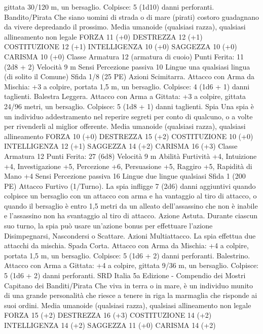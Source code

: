 \begin{multicols}{2}
gittata 30/120 m, un bersaglio.
Colpisce: 5 (1d10) danni perforanti.
Bandito/Pirata
Che siano uomini di strada o di mare (pirati) costoro
guadagnano da vivere depredando il prossimo.
Media umanoide (qualsiasi razza), qualsiasi allineamento non
legale
FORZA 11 (+0)
DESTREZZA 12 (+1)
COSTITUZIONE 12 (+1)
INTELLIGENZA 10 (+0)
SAGGEZZA 10 (+0)
CARISMA 10 (+0)
Classe Armatura 12 (armatura di cuoio)
\hspace*{0pt}\hfill{Punti Ferita}: 11 (2d8 + 2)
Velocità 9 m
Sensi Percezione passiva 10
Lingue una qualsiasi lingua (di solito il Comune)
Sfida 1/8 (25 PE)
Azioni
Scimitarra. Attacco con Arma da Mischia: +3 a colpire, portata
1,5 m, un bersaglio.
Colpisce: 4 (1d6 + 1) danni taglienti.
Balestra Leggera. Attacco con Arma a Gittata: +3 a colpire,
gittata 24/96 metri, un bersaglio.
Colpisce: 5 (1d8 + 1) danni taglienti.
Spia
Una spia è un individuo addestramento nel reperire
segreti per conto di qualcuno, o a volte per rivenderli al
miglior offerente.
Media umanoide (qualsiasi razza), qualsiasi allineamento
FORZA 10 (+0)
DESTREZZA 15 (+2)
COSTITUZIONE 10 (+0)
INTELLIGENZA 12 (+1)
SAGGEZZA 14 (+2)
CARISMA 16 (+3)
Classe Armatura 12
\hspace*{0pt}\hfill{Punti Ferita}: 27 (6d8)
Velocità 9 m
Abilità Furtività +4, Intuizione +4, Investigazione +5,
Percezione +6, Persuasione +5, Raggiro +5, Rapidità di Mano +4
Sensi Percezione passiva 16
Lingue due lingue qualsiasi
Sfida 1 (200 PE)
Attacco Furtivo (1/Turno). La spia infligge 7 (2d6) danni aggiuntivi
quando colpisce un bersaglio con un attacco con arma e ha vantaggio
al tiro di attacco, o quando il bersaglio è entro 1,5 metri da un alleato
dell’assassino che non è inabile e l’assassino non ha svantaggio al
tiro di attacco.
Azione Astuta. Durante ciascun suo turno, la spia può usare un’azione
bonus per effettuare l’azione Disimpegnarsi, Nascondersi o Scattare.
Azioni
Multiattacco. La spia effettua due attacchi da mischia.
Spada Corta. Attacco con Arma da Mischia: +4 a colpire, portata
1,5 m, un bersaglio.
Colpisce: 5 (1d6 + 2) danni perforanti.
Balestrino. Attacco con Arma a Gittata: +4 a colpire, gittata 9/36
m, un bersaglio. Colpisce: 5 (1d6 + 2) danni perforanti.
SRD Italia 5a Edizione - Compendio dei Mostri
Capitano dei Banditi/Pirata
Che viva in terra o in mare, è un individuo munito di una
grande personalità che riesce a tenere in riga la
marmaglia che risponde ai suoi ordini.
Media umanoide (qualsiasi razza), qualsiasi allineamento non
legale
FORZA 15 (+2)
DESTREZZA 16 (+3)
COSTITUZIONE 14 (+2)
INTELLIGENZA 14 (+2)
SAGGEZZA 11 (+0)
CARISMA 14 (+2)

\end{multicols}
